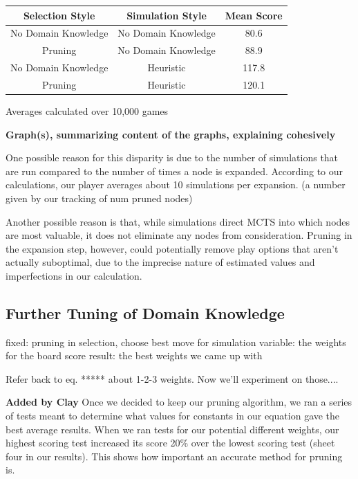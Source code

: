 \documentclass[letterpaper]{article}
\begin{document}
\begin{minipage}{\linewidth}
\centering
\label{tbl:SelectionTable}
\begin{tabular}{c c c}
\hline
Selection Style & Simulation Style & Mean Score \\
\hline
No Domain Knowledge & No Domain Knowledge & 80.6 \\
Pruning & No Domain Knowledge & 88.9 \\
No Domain Knowledge & Heuristic & 117.8 \\
Pruning & Heuristic & 120.1 \\
\hline
\end{tabular}\par
\bigskip
Averages calculated over 10,000 games
\end{minipage}
{\bf Graph(s), summarizing content of the graphs, explaining cohesively}

One possible reason for this disparity is due to the number of simulations that are run compared to the number of times a node is expanded. According to our calculations, our player averages about 10 simulations per expansion. (a number given by our tracking of num pruned nodes) 

Another possible reason is that, while simulations direct MCTS into which nodes are most valuable, it does not eliminate any nodes from consideration. Pruning in the expansion step, however, could potentially remove play options that aren’t actually suboptimal, due to the imprecise nature of estimated values and imperfections in our calculation.

\subsection{Further Tuning of Domain Knowledge}

fixed: pruning in selection, choose best move for simulation
variable: the weights for the board score
result: the best weights we came up with

Refer back to eq. ***** about 1-2-3 weights. Now we'll experiment on those....



{\bf Added by Clay} Once we decided to keep our pruning algorithm, we ran a series of tests meant to determine what values for constants in our equation gave the best average results. When we ran tests for our potential different weights, our highest scoring test increased its score 20\% over the lowest scoring test (sheet four in our results). This shows how important an accurate method for pruning is. 
\end{document}
